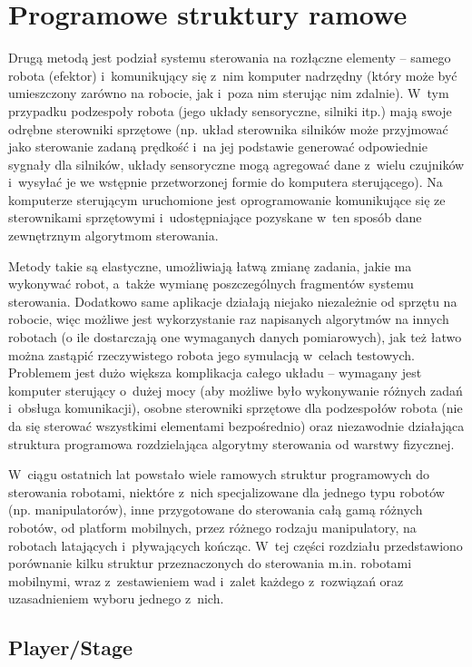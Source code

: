 \section{Programowe struktury ramowe}

Drugą metodą jest podział systemu sterowania na rozłączne elementy -- samego
robota (efektor) i~komunikujący się z~nim komputer nadrzędny (który może być umieszczony
zarówno na robocie, jak i~poza nim sterując nim zdalnie). W~tym przypadku podzespoły
robota (jego układy sensoryczne, silniki itp.) mają swoje odrębne sterowniki sprzętowe
(np. układ sterownika silników może przyjmować jako sterowanie zadaną prędkość
i~na jej podstawie generować odpowiednie sygnały dla silników, układy sensoryczne
mogą agregować dane z~wielu czujników i~wysyłać je we wstępnie przetworzonej formie
do komputera sterującego). Na komputerze sterującym uruchomione jest oprogramowanie
komunikujące się ze sterownikami sprzętowymi i~udostępniające pozyskane w~ten sposób
dane zewnętrznym algorytmom sterowania.

Metody takie są elastyczne, umożliwiają łatwą zmianę zadania, jakie ma wykonywać robot,
a~także wymianę poszczególnych fragmentów systemu sterowania. Dodatkowo same aplikacje
działają niejako niezależnie od sprzętu na robocie, więc możliwe jest wykorzystanie
raz napisanych algorytmów na innych robotach (o ile dostarczają one wymaganych danych
pomiarowych), jak też łatwo można zastąpić rzeczywistego robota jego symulacją w~celach
testowych. Problemem jest dużo większa komplikacja całego układu -- wymagany jest
komputer sterujący o~dużej mocy (aby możliwe było wykonywanie różnych zadań i~obsługa
komunikacji), osobne sterowniki sprzętowe dla podzespołów robota (nie da się sterować
wszystkimi elementami bezpośrednio) oraz niezawodnie działająca struktura programowa
rozdzielająca algorytmy sterowania od warstwy fizycznej.

W~ciągu ostatnich lat powstało wiele ramowych struktur programowych do sterowania
robotami, niektóre z~nich specjalizowane dla jednego typu robotów (np. manipulatorów),
inne przygotowane do sterowania całą gamą różnych robotów, od platform mobilnych,
przez różnego rodzaju manipulatory, na robotach latających i~pływających kończąc.
W~tej części rozdziału przedstawiono porównanie kilku struktur przeznaczonych do
sterowania m.in. robotami mobilnymi, wraz z~zestawieniem wad i~zalet każdego z~rozwiązań
oraz uzasadnieniem wyboru jednego z~nich.


\subsection{Player/Stage}

